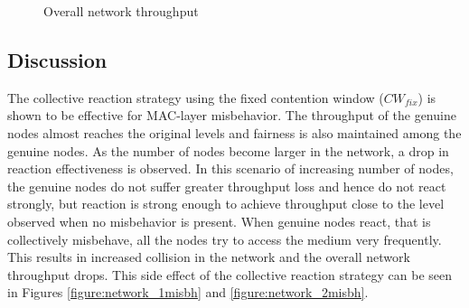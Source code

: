 \documentclass[12pt,letterpaper,english]{article}
\begin{document}
\begin{figure}[H]
\centering
{}
\caption{Overall network throughput}
\label{figure:networkthroughput}
\end{figure}
\subsection{Discussion}
\label{resultdiscussion}
\indent The collective reaction strategy using the fixed contention window ($CW_{fix}$) is shown to be effective for MAC-layer misbehavior. The throughput of the genuine nodes almost reaches the original levels and fairness is also maintained among the genuine nodes. As the number of nodes become larger in the network, a drop in reaction effectiveness is observed. In this scenario of increasing number of nodes, the genuine nodes do not suffer greater throughput loss and hence do not react strongly, but reaction is strong enough to achieve throughput close to the level observed when no misbehavior is present. When genuine nodes react, that is collectively misbehave, all the nodes try to access the medium very frequently. This results in increased collision in the network and the overall network throughput drops. This side effect of the collective reaction strategy can be seen in Figures \ref{figure:network_1misbh} and \ref{figure:network_2misbh}.
\end{document}
